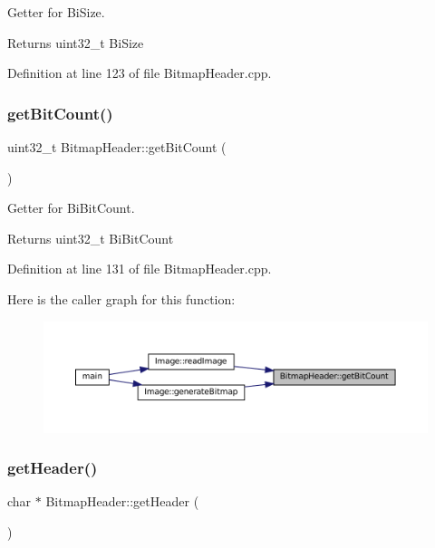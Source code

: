 Getter for Bi\+Size. 

\begin{DoxyReturn}{Returns}
uint32\+\_\+t Bi\+Size 
\end{DoxyReturn}


Definition at line 123 of file Bitmap\+Header.\+cpp.

\mbox{\label{classBitmapHeader_a2660782990f1d9547e0aef501f666969}} 
\subsubsection{\texorpdfstring{getBitCount()}{getBitCount()}}
{\footnotesize\ttfamily uint32\+\_\+t Bitmap\+Header\+::get\+Bit\+Count (\begin{DoxyParamCaption}{ }\end{DoxyParamCaption})}



Getter for Bi\+Bit\+Count. 

\begin{DoxyReturn}{Returns}
uint32\+\_\+t Bi\+Bit\+Count 
\end{DoxyReturn}


Definition at line 131 of file Bitmap\+Header.\+cpp.

Here is the caller graph for this function\+:
\nopagebreak
\begin{figure}[H]
\begin{center}
\leavevmode
\includegraphics[width=350pt]{classBitmapHeader_a2660782990f1d9547e0aef501f666969_icgraph}
\end{center}
\end{figure}
\mbox{\label{classBitmapHeader_aa29e1acc8a7a588867039d7c0bdcde04}} 
\subsubsection{\texorpdfstring{getHeader()}{getHeader()}}
{\footnotesize\ttfamily char $\ast$ Bitmap\+Header\+::get\+Header (\begin{DoxyParamCaption}{ }\end{DoxyParamCaption})}



